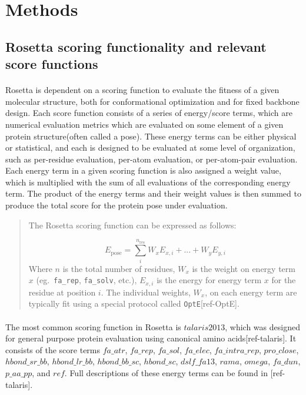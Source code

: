 \section{Methods}

\subsection{Rosetta scoring functionality and relevant score functions}
\paragraph{}
Rosetta is dependent on a scoring function to evaluate the fitness of a given molecular structure, both for conformational optimization and for fixed backbone design.
Each score function consists of a series of energy/score terms, which are numerical evaluation metrics which are evaluated on some element of a given protein structure(often called a pose).
These energy terms can be either physical or statistical, and each is designed to be evaluated at some level of organization, such as per-residue evaluation, per-atom evaluation, or per-atom-pair evaluation.
Each energy term in a given scoring function is also assigned a weight value, which is multiplied with the sum of all evaluations of the corresponding energy term.
The product of the energy terms and their weight values is then summed to produce the total score for the protein pose under evaluation.

\begin{quote} 
The Rosetta scoring function can be expressed as follows:

\begin{equation}
E_{\text{pose}} = \sum_{i}^{n_{\text{res}}} W_{x} E_{x,i} + ... + W_{y} E_{y,i}
\end{equation}
Where $n$ is the total number of residues, $W_{x}$ is the weight on energy term $x$ (eg.\ \texttt{fa\_rep}, \texttt{fa\_solv}, etc.), $E_{x,i}$ is the energy for energy term $x$ for the residue at position $i$. 
The individual weights, $W_x$, on each energy term are typically fit using a special protocol called \texttt{OptE}[ref-OptE].
\end{quote}

\paragraph{}
The most common scoring function in Rosetta is $talaris2013$, which was designed for general purpose protein evaluation using canonical amino acids[ref-talaris].
It consists of the score terms $fa\_atr$, $fa\_rep$, $fa\_sol$, $fa\_elec$, $fa\_intra\_rep$, $pro\_close$, $hbond\_sr\_bb$, $hbond\_lr\_bb$, $hbond\_bb\_sc$, $hbond\_sc$, $dslf\_fa13$, $rama$, $omega$, $fa\_dun$, $p\_aa\_pp$, and $ref$.
Full descriptions of these energy terms can be found in [ref-talaris].

